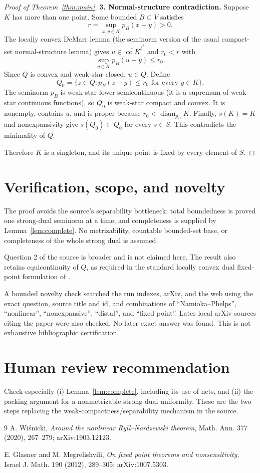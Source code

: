 \documentclass[11pt]{article}
\newcommand{\co}{\operatorname{co}}
\newcommand{\diam}{\operatorname{diam}}
\begin{document}
\begin{proof}[Proof of Theorem~\ref{thm:main}]
\smallskip
\noindent\textbf{3. Normal-structure contradiction.}
Suppose $K$ has more than one point.  Some bounded $B\subset V$ satisfies
\[
 r=\sup_{x,y\in K}p_B(x-y)>0.
\]
The locally convex DeMarr lemma (the seminorm version of the usual compact-set
normal-structure lemma) gives $u\in\overline{\co K}^{\xi^*}$ and $r_0<r$ with
\[
 \sup_{y\in K}p_B(u-y)\le r_0.
\]
Since $Q$ is convex and weak-star closed, $u\in Q$.  Define
\[
 Q_0=\{z\in Q:p_B(z-y)\le r_0\text{ for every }y\in K\}.
\]
The seminorm $p_B$ is weak-star lower semicontinuous (it is a supremum of
weak-star continuous functions), so $Q_0$ is weak-star compact and convex.
It is nonempty, contains $u$, and is proper because $r_0<\diam_{p_B}K$.
Finally, $s(K)=K$ and nonexpansivity give $s(Q_0)\subset Q_0$ for every
$s\in S$.  This contradicts the minimality of $Q$.

Therefore $K$ is a singleton, and its unique point is fixed by every element
of $S$.
\end{proof}

\section{Verification, scope, and novelty}

The proof avoids the source's separability bottleneck: total boundedness is
proved one strong-dual seminorm at a time, and completeness is supplied by
Lemma~\ref{lem:complete}.  No metrizability, countable bounded-set base, or
completeness of the whole strong dual is assumed.

Question 2 of the source is broader and is not claimed here.  The result also
retains equicontinuity of $Q$, as required in the standard locally convex dual
fixed-point formulation of \cite{GM2012}.

A bounded novelty check searched the run indexes, arXiv, and the web using the
exact question, source title and id, and combinations of ``Namioka--Phelps'',
``nonlinear'', ``nonexpansive'', ``distal'', and ``fixed point''.  Later local
arXiv sources citing the paper were also checked.  No later exact answer was
found.  This is not exhaustive bibliographic certification.

\section*{Human review recommendation}

Check especially (i) Lemma~\ref{lem:complete}, including its use of nets, and
(ii) the packing argument for a nonmetrizable strong-dual uniformity.  These
are the two steps replacing the weak-compactness/separability mechanism in the
source.

\begin{thebibliography}{9}
A. Wi\'snicki,
\emph{Around the nonlinear Ryll--Nardzewski theorem},
Math. Ann. 377 (2020), 267--279; arXiv:1903.12123.

E. Glasner and M. Megrelishvili,
\emph{On fixed point theorems and nonsensitivity},
Israel J. Math. 190 (2012), 289--305; arXiv:1007.5303.
\end{thebibliography}
\end{document}
